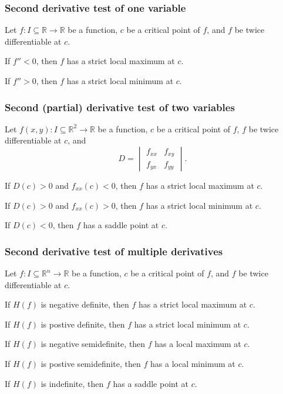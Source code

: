 \subsubsection{Second derivative test of one variable}
Let $f\colon I\subseteq\mathbb{R}\to\mathbb{R}$ be a function, $c$ be a critical point of $f$, and $f$ be twice differentiable at $c$.
\bit
\item If $f''<0$, then $f$ has a strict local maximum at $c$.
\item If $f''>0$, then $f$ has a strict local minimum at $c$.
\eit
\subsubsection{Second (partial) derivative test of two variables}
Let $f(x,y)\colon I\subseteq\mathbb{R}^2\to\mathbb{R}$ be a function, $c$ be a critical point of $f$, $f$ be twice differentiable at $c$, and
\[D=\begin{vmatrix}
f_{xx} & f_{xy}\\
f_{yx} & f_{yy}
\end{vmatrix}.\]
\bit
\item If $D(c)>0$ and $f_{xx}(c)<0$, then $f$ has a strict local maximum at $c$.
\item If $D(c)>0$ and $f_{xx}(c)>0$, then $f$ has a strict local minimum at $c$.
\item If $D(c)<0$, then $f$ has a saddle point at $c$.
\eit
\subsubsection{Second derivative test of multiple derivatives}
Let $f\colon I\subseteq\mathbb{R}^n\to\mathbb{R}$ be a function, $c$ be a critical point of $f$, and $f$ be twice differentiable at $c$.
\bit
\item If $H(f)$ is negative definite, then $f$ has a strict local maximum at $c$.
\item If $H(f)$ is postive definite, then $f$ has a strict local minimum at $c$.
\item If $H(f)$ is negative semidefinite, then $f$ has a local maximum at $c$.
\item If $H(f)$ is postive semidefinite, then $f$ has a local minimum at $c$.
\item If $H(f)$ is indefinite, then $f$ has a saddle point at $c$.
\eit
